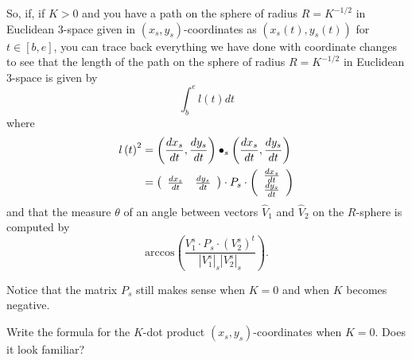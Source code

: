 \documentclass{ximera}
\begin{document}
So, if, if $K>0$ and you have a path on the sphere of radius $R=K^{-1/2}$ in
Euclidean $3$-space given in $\left(  x_{s},y_{s}\right)  $-coordinates as
$\left(  x_{s}\left(  t\right)  ,y_{s}\left(  t\right)  \right)  $ for
$t\in\left[  b,e\right]  $, you can trace back everything we have done with
coordinate changes to see that the length of the path on the sphere of radius
$R=K^{-1/2}$ in Euclidean $3$-space is given by%
\[%
{\displaystyle\int\nolimits_{b}^{e}}
l\left(  t\right)  dt
\]
where%
\begin{align*}
l\left(  t\right)  ^{2}  &  =\left(  \frac{dx_{s}}{dt},\frac{dy_{s}}%
{dt}\right)  \bullet_{s}\left(  \frac{dx_{s}}{dt},\frac{dy_{s}}{dt}\right) \\
&  =\left(
\begin{array}
[c]{cc}%
\frac{dx_{s}}{dt} & \frac{dy_{s}}{dt}%
\end{array}
\right)  \cdot P_{s}\cdot\left(
\begin{array}
[c]{c}%
\frac{dx_{s}}{dt}\\
\frac{dy_{s}}{dt}%
\end{array}
\right)
\end{align*}
and that the measure $\theta$ of an angle between vectors $\hat{V}_{1}$ and
$\hat{V}_{2}$ on the $R$-sphere is computed by%
\[
\mathrm{arccos}\left(  \frac{V_{1}^{s}\cdot P_{s}\cdot\left(  V_{2}%
^{s}\right)  ^{t}}{\left\vert V_{1}^{s}\right\vert _{s}\left\vert V_{2}%
^{s}\right\vert _{s}}\right)  .
\]


Notice that the matrix $P_{s}$ still makes sense when $K=0$ and when $K$
becomes negative.

\begin{exercise}
Write the formula for the $K$-dot product $\left(  x_{s},y_{s}\right)
$-coordinates when $K=0$. Does it look familiar?
\end{exercise}
\end{document}
